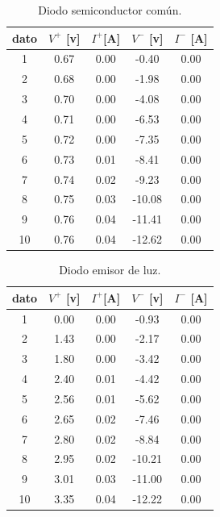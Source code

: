 \documentclass[]{article}
\begin{document}
\begin{table}
  \centering
  \begin{tabular}{|c|c|c|c|c|} \hline
    dato    &   $V^{+}$ [v]  &    $I^{+}$[A]  &   $V^{-}$ [v]  &    $I^{-}$ [A]  \\ \hline
    1&0.67& 0.00&     -0.40& 0.00\\ \hline
    2&0.68& 0.00&     -1.98& 0.00\\ \hline
    3&0.70& 0.00&     -4.08& 0.00\\ \hline
    4&0.71& 0.00&     -6.53& 0.00\\ \hline
    5&0.72& 0.00&     -7.35& 0.00\\ \hline
    6&0.73& 0.01&     -8.41& 0.00\\ \hline
    7&0.74& 0.02&     -9.23& 0.00\\ \hline
    8&0.75& 0.03&     -10.08& 0.00\\ \hline
    9&0.76& 0.04&     -11.41& 0.00\\ \hline
    10&0.76& 0.04&     -12.62& 0.00 \\ \hline
    
    
  \end{tabular}
  \caption{\label{tab: diodo-comun} Diodo semiconductor común.}
\end{table}


\begin{table}
  \centering
  \begin{tabular}{|c|c|c|c|c|} \hline
    dato    &   $V^{+}$ [v]  &    $I^{+}$[A]  &   $V^{-}$ [v]  &    $I^{-}$ [A]  \\ \hline
    1&0.00& 0.00&     -0.93	&0.00\\ \hline
    2&1.43& 0.00&     -2.17	&0.00\\ \hline
    3&1.80& 0.00&     -3.42	&0.00\\ \hline
    4&2.40& 0.01&     -4.42	&0.00\\ \hline
    5&2.56& 0.01&     -5.62	&0.00\\ \hline
    6&2.65& 0.02&     -7.46	&0.00\\ \hline
    7&2.80& 0.02&     -8.84	&0.00\\ \hline
    8&2.95& 0.02&     -10.21	&0.00\\ \hline
    9&3.01& 0.03&     -11.00	&0.00\\ \hline
    10&3.35& 0.04&     -12.22	&0.00\\ \hline
    
    
  \end{tabular}
  \caption{\label{tab: emisor-luz} Diodo emisor de luz.}
\end{table}
\end{document}
